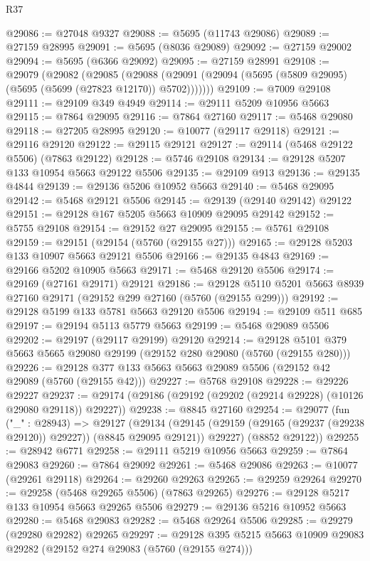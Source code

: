 \begin{lexlean}{R37}
\begin{coremodule}
@29086 := @27048 @9327
@29088 := @5695 (@11743 @29086)
@29089 := @27159 @28995
@29091 := @5695 (@8036 @29089)
@29092 := @27159 @29002
@29094 := @5695 (@6366 @29092)
@29095 := @27159 @28991
@29108 := @29079
    (@29082
      (@29085
        (@29088 (@29091 (@29094 (@5695 (@5809 @29095) (@5695 (@5699 (@27823 @12170)) @5702)))))))
@29109 := @7009 @29108
@29111 := @29109 @349 @4949
@29114 := @29111 @5209 @10956 @5663
@29115 := @7864 @29095
@29116 := @7864 @27160
@29117 := @5468 @29080
@29118 := @27205 @28995
@29120 := @10077 (@29117 @29118)
@29121 := @29116 @29120
@29122 := @29115 @29121
@29127 := @29114 (@5468 @29122 @5506) (@7863 @29122)
@29128 := @5746 @29108
@29134 := @29128 @5207 @133 @10954 @5663 @29122 @5506
@29135 := @29109 @913
@29136 := @29135 @4844
@29139 := @29136 @5206 @10952 @5663
@29140 := @5468 @29095
@29142 := @5468 @29121 @5506
@29145 := @29139 (@29140 @29142) @29122
@29151 := @29128 @167 @5205 @5663 @10909 @29095 @29142
@29152 := @5755 @29108
@29154 := @29152 @27 @29095
@29155 := @5761 @29108
@29159 := @29151 (@29154 (@5760 (@29155 @27)))
@29165 := @29128 @5203 @133 @10907 @5663 @29121 @5506
@29166 := @29135 @4843
@29169 := @29166 @5202 @10905 @5663
@29171 := @5468 @29120 @5506
@29174 := @29169 (@27161 @29171) @29121
@29186 := @29128 @5110 @5201 @5663 @8939 @27160 @29171 (@29152 @299 @27160 (@5760 (@29155 @299)))
@29192 := @29128 @5199 @133 @5781 @5663 @29120 @5506
@29194 := @29109 @511 @685
@29197 := @29194 @5113 @5779 @5663
@29199 := @5468 @29089 @5506
@29202 := @29197 (@29117 @29199) @29120
@29214 := @29128 @5101 @379 @5663 @5665 @29080 @29199 (@29152 @280 @29080 (@5760 (@29155 @280)))
@29226 := @29128 @377 @133 @5663 @5663 @29089 @5506 (@29152 @42 @29089 (@5760 (@29155 @42)))
@29227 := @5768 @29108
@29228 := @29226 @29227
@29237 := @29174 (@29186 (@29192 (@29202 (@29214 @29228) (@10126 @29080 @29118)) @29227))
@29238 := @8845 @27160
@29254 := @29077
    (fun ("_" : @28943) =>
    @29127
      (@29134
        (@29145 (@29159 (@29165 (@29237 (@29238 @29120)) @29227)) (@8845 @29095 @29121))
        @29227)
      (@8852 @29122))
@29255 := @28942 @6771
@29258 := @29111 @5219 @10956 @5663
@29259 := @7864 @29083
@29260 := @7864 @29092
@29261 := @5468 @29086
@29263 := @10077 (@29261 @29118)
@29264 := @29260 @29263
@29265 := @29259 @29264
@29270 := @29258 (@5468 @29265 @5506) (@7863 @29265)
@29276 := @29128 @5217 @133 @10954 @5663 @29265 @5506
@29279 := @29136 @5216 @10952 @5663
@29280 := @5468 @29083
@29282 := @5468 @29264 @5506
@29285 := @29279 (@29280 @29282) @29265
@29297 := @29128 @395 @5215 @5663 @10909 @29083 @29282 (@29152 @274 @29083 (@5760 (@29155 @274)))

\end{coremodule}
\end{lexlean}
